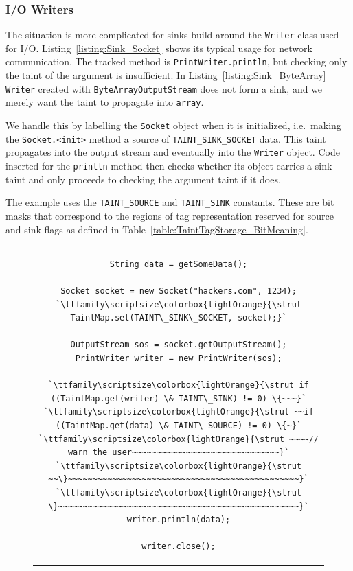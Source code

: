 \documentclass[12pt,twoside,notitlepage]{report}
\newcommand{\highlight}[1]{\colorbox{lightOrange}{\strut #1}}
\newcommand{\lsthl}[1] {\ttfamily\scriptsize\highlight{#1}}
\begin{document}
\subsubsection{I/O Writers}

The situation is more complicated for sinks build around the \verb$Writer$ class used for I/O. Listing~\ref{listing:Sink_Socket} shows its typical usage for network communication. The tracked method is \verb$PrintWriter.println$, but checking only the taint of the argument is insufficient. In Listing~\ref{listing:Sink_ByteArray} \verb$Writer$ created with \verb$ByteArrayOutputStream$ does not form a sink, and we merely want the taint to propagate into \verb$array$. 

We handle this by labelling the \verb$Socket$ object when it is initialized, i.e.\ making the \verb$Socket.<init>$ method a source of \verb$TAINT_SINK_SOCKET$ data. This taint propagates into the output stream and eventually into the \verb$Writer$ object. Code inserted for the \verb$println$ method then checks whether its object carries a sink taint and only proceeds to checking the argument taint if it does.

The example uses the \verb$TAINT_SOURCE$ and \verb$TAINT_SINK$ constants. These are bit masks that correspond to the regions of tag representation reserved for source and sink flags as defined in Table~\ref{table:TaintTagStorage_BitMeaning}.

\begin{figure}[h]
	\centering
	\begin{tabular}{c}
	\begin{lstlisting}
String data = getSomeData();

Socket socket = new Socket("hackers.com", 1234);
`\lsthl{TaintMap.set(TAINT\_SINK\_SOCKET, socket);}`

OutputStream sos = socket.getOutputStream();
PrintWriter writer = new PrintWriter(sos);

`\lsthl{if ((TaintMap.get(writer) \& TAINT\_SINK) != 0) \{~~~}`
`\lsthl{~~if ((TaintMap.get(data) \& TAINT\_SOURCE) != 0) \{~}`
`\lsthl{~~~~// warn the user~~~~~~~~~~~~~~~~~~~~~~~~~~~~~~}`
`\lsthl{~~\}~~~~~~~~~~~~~~~~~~~~~~~~~~~~~~~~~~~~~~~~~~~~~~~}`
`\lsthl{\}~~~~~~~~~~~~~~~~~~~~~~~~~~~~~~~~~~~~~~~~~~~~~~~~~}`
writer.println(data);

writer.close();
	\end{lstlisting}
	\end{tabular}
	\begin{lstlisting}[caption={Writer interface used for network communication, with sink instrumentation.},
	                   label={listing:Sink_Socket}]
	\end{lstlisting}
\end{figure}
\end{document}
